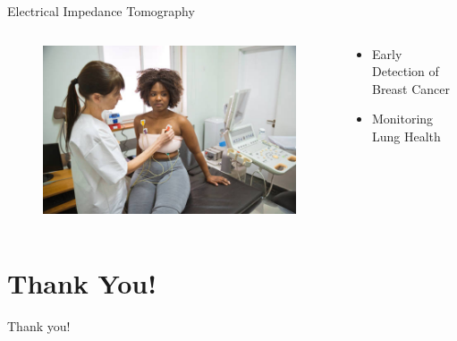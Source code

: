 \documentclass[12pt]{beamer}
\begin{document}
\begin{frame}{Electrical Impedance Tomography}
    \begin{columns}
	\begin{column}{0.5\textwidth}
   		\begin{figure}
   		    \centering
   		    \includegraphics{ecg_photo_11-19-2023.jpeg}
   		    \label{fig:breast cancer}
   		\end{figure}
	\end{column}
	\begin{column}{0.5\textwidth}
   		\begin{itemize}
   		    \item Early Detection of Breast Cancer
         \item Monitoring Lung Health
   		\end{itemize}
	\end{column}
    \end{columns}
\end{frame}
\appendix
\section{Thank You!}
{\BackgroundShaded
\begin{frame}{\hspace{4cm} Thank you!}
\end{frame}
}
\end{document}
